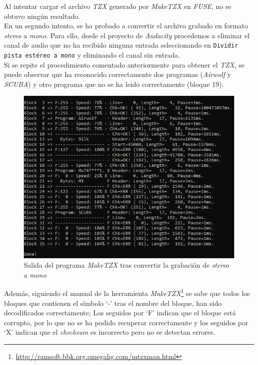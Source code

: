\documentclass{article}
\begin{document}
Al intentar cargar el archivo \textit{TZX} generado por \textit{MakeTZX} en \textit{FUSE}, no se obtuvo ningún resultado. \\

En un segundo intento, se ha probado a convertir el archivo grabado en formato \textit{stereo} a \textit{mono}. Para ello, desde el proyecto de \textit{Audacity} procedemos a eliminar el canal de audio que no ha recibido ninguna entrada seleccionando en \texttt{Dividir pista estéreo a mono} y eliminando el canal sin entrada. \\
Si se repite el procedimiento comentado anteriormente para obtener el \textit{TZX}, se puede observar que ha reconocido correctamente dos programas (\textit{Airwolf} y \textit{SCUBA}) y otro programa que no se ha leido correctamente (bloque 19).\\

\begin{figure}[h!]
    \centering
    \includegraphics[scale=0.4]{images/stereo-to-mono.png}
    \caption{Salida del programa \textit{MakeTZX} tras convertir la grabación de \textit{stereo} a \textit{mono}}
    \label{fig:stereo-to-mono}
\end{figure}

Además, siguiendo el manual de la herramienta \textit{MakeTZX}\footnote{\url{http://ramsoft.bbk.org.omegahg.com/mtzxman.html}} se sabe que todos los bloques que contienen el símbolo `-' tras el nombre del bloque, han sido decodificados correctamente; Los seguidos por `F' indican que el bloque está corrupto, por lo que no se ha podido recuperar correctamente y los seguidos por `X' indican que el \textit{checksum} es incorrecto pero no se detectan errores.\\
\end{document}

